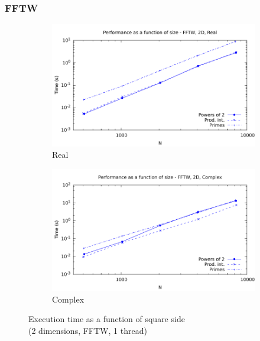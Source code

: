 \documentclass[12pt, a4paper]{article}
\begin{document}
\subsubsection{FFTW}
\begin{figure}[H]
\captionsetup{width=0.8\linewidth}
\centering
\begin{subfigure}{.5\textwidth}
\centering
\includegraphics[width=.9\linewidth]{graphs/performance/2d-fftw-r.pdf}
\caption{Real}
\label{2DFFTWR}
\end{subfigure}%
\begin{subfigure}{.5\textwidth}
\centering
\includegraphics[width=.9\linewidth]{graphs/performance/2d-fftw-c.pdf}
\caption{Complex}
\label{2DFFTWC}
\end{subfigure}
\caption{Execution time as a function of square side\\(2 dimensions, FFTW, 1 thread)}
\label{2DFFTW}
\end{figure}
\end{document}
